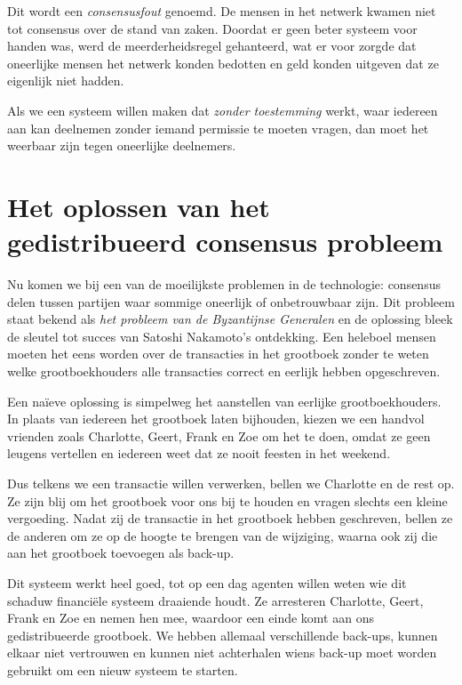 \documentclass[smalldemyvopaper,11pt,twoside,onecolumn,openright,extrafontsizes]{memoir}
\begin{document}
Dit wordt een \textit{consensusfout} genoemd. De mensen in het netwerk kwamen niet tot consensus over de stand van zaken. Doordat er geen beter systeem voor handen was, werd de meerderheidsregel gehanteerd, wat er voor zorgde dat oneerlijke mensen het netwerk konden bedotten en geld konden uitgeven dat ze eigenlijk niet hadden.

Als we een systeem willen maken dat \textit{zonder toestemming} werkt, waar iedereen aan kan deelnemen zonder iemand permissie te moeten vragen, dan moet het weerbaar zijn tegen oneerlijke deelnemers.

\section{Het oplossen van het gedistribueerd consensus probleem}

Nu komen we bij een van de moeilijkste problemen in de technologie: consensus delen tussen partijen waar sommige oneerlijk of onbetrouwbaar zijn. Dit probleem staat bekend als \textit{het probleem van de Byzantijnse Generalen} en de oplossing bleek de sleutel tot succes van Satoshi Nakamoto's ontdekking. Een heleboel mensen moeten het eens worden over de transacties in het grootboek zonder te weten welke grootboekhouders alle transacties correct en eerlijk hebben opgeschreven.

Een naïeve oplossing is simpelweg het aanstellen van eerlijke grootboekhouders. In plaats van iedereen het grootboek laten bijhouden, kiezen we een handvol vrienden zoals Charlotte, Geert, Frank en Zoe om het te doen, omdat ze geen leugens vertellen en iedereen weet dat ze nooit feesten in het weekend.

Dus telkens we een transactie willen verwerken, bellen we Charlotte en de rest op. Ze zijn blij om het grootboek voor ons bij te houden en vragen slechts een kleine vergoeding. Nadat zij de transactie in het grootboek hebben geschreven, bellen ze de anderen om ze op de hoogte te brengen van de wijziging, waarna ook zij die aan het grootboek toevoegen als back-up. 

Dit systeem werkt heel goed, tot op een dag agenten willen weten wie dit schaduw financiële systeem draaiende houdt. Ze arresteren Charlotte, Geert, Frank en Zoe en nemen hen mee, waardoor een einde komt aan ons gedistribueerde grootboek. We hebben allemaal verschillende back-ups, kunnen elkaar niet vertrouwen en kunnen niet achterhalen wiens back-up moet worden gebruikt om een nieuw systeem te starten.
\end{document}
